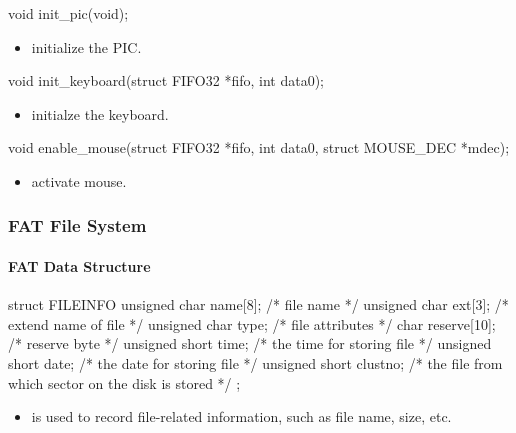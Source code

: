\documentclass{swfcthesis}
\begin{document}
\begin{ccode}
void init_pic(void);
\end{ccode}
\begin{itemize}
\item initialize the PIC.
\end{itemize}

\begin{ccode}
void init_keyboard(struct FIFO32 *fifo, int data0);
\end{ccode}
\begin{itemize}
\item initialze the keyboard.
\end{itemize}

\begin{ccode}
void enable_mouse(struct FIFO32 *fifo, int data0, struct MOUSE_DEC *mdec);
\end{ccode}
\begin{itemize}
\item activate mouse.
\end{itemize}

\subsubsection{FAT File System}
\label{sec:fat}

  
\paragraph{FAT Data Structure}

\begin{codeblock}[1]
\begin{ccode}
struct FILEINFO
{ 
  unsigned char name[8];   /* file name */
  unsigned char ext[3];    /* extend name of file */
  unsigned char type;      /* file attributes */
  char reserve[10];        /* reserve byte */
  unsigned short time;     /* the time for storing file */
  unsigned short date;     /* the date for storing file */
  unsigned short  clustno; /* the file from which sector on the disk is stored */
};
\end{ccode}
\end{codeblock}
\begin{itemize}
\item is used to record file-related information, such as file name, size, etc.
\end{itemize}
\end{document}
